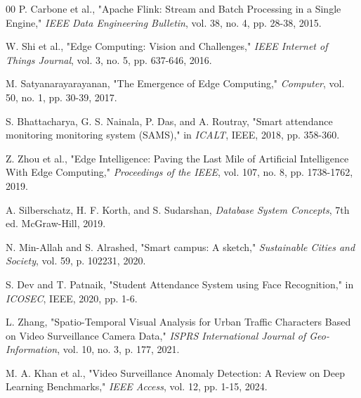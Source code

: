 \documentclass[conference]{IEEEtran}
\begin{document}
\begin{thebibliography}{00}
 P. Carbone et al., "Apache Flink: Stream and Batch Processing in a Single Engine," \textit{IEEE Data Engineering Bulletin}, vol. 38, no. 4, pp. 28-38, 2015.

 W. Shi et al., "Edge Computing: Vision and Challenges," \textit{IEEE Internet of Things Journal}, vol. 3, no. 5, pp. 637-646, 2016.

 M. Satyanarayarayanan, "The Emergence of Edge Computing," \textit{Computer}, vol. 50, no. 1, pp. 30-39, 2017.

 S. Bhattacharya, G. S. Nainala, P. Das, and A. Routray, "Smart attendance monitoring monitoring system (SAMS)," in \textit{ICALT}, IEEE, 2018, pp. 358-360.

 Z. Zhou et al., "Edge Intelligence: Paving the Last Mile of Artificial Intelligence With Edge Computing," \textit{Proceedings of the IEEE}, vol. 107, no. 8, pp. 1738-1762, 2019.

 A. Silberschatz, H. F. Korth, and S. Sudarshan, \textit{Database System Concepts}, 7th ed. McGraw-Hill, 2019.

 N. Min-Allah and S. Alrashed, "Smart campus: A sketch," \textit{Sustainable Cities and Society}, vol. 59, p. 102231, 2020.

 S. Dev and T. Patnaik, "Student Attendance System using Face Recognition," in \textit{ICOSEC}, IEEE, 2020, pp. 1-6.

 L. Zhang, "Spatio-Temporal Visual Analysis for Urban Traffic Characters Based on Video Surveillance Camera Data," \textit{ISPRS International Journal of Geo-Information}, vol. 10, no. 3, p. 177, 2021.

 M. A. Khan et al., "Video Surveillance Anomaly Detection: A Review on Deep Learning Benchmarks," \textit{IEEE Access}, vol. 12, pp. 1-15, 2024.

\end{thebibliography}
\end{document}

